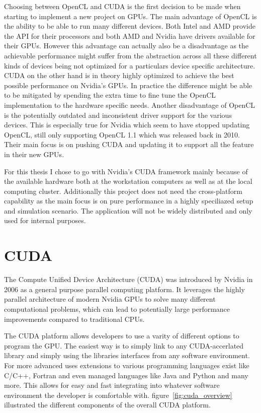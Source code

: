 \documentclass[a4paper,11pt]{kth-mag}
\begin{document}
Choosing between OpenCL and CUDA is the first decision to be made when starting to implement a new project on GPUs. The main advantage of OpenCL is the ability to be able to run many different devices. Both Intel and AMD provide the API for their processors and both AMD and Nvidia have drivers available for their GPUs. However this advantage can actually also be a disadvantage as the achievable performance might suffer from the abstraction across all these different kinds of devices being not optimized for a particulars device specific architecture. CUDA on the other hand is in theory highly optimized to achieve the best possible performance on Nvidia's GPUs. In practice the difference might be able to be mitigated by spending the extra time to fine tune the OpenCL implementation to the hardware specific needs. Another disadvantage of OpenCL is the potentially outdated and inconsistent driver support for the various devices. This is especially true for Nvidia which seem to have stopped updating OpenCL, still only supporting OpenCL 1.1 which was released back in 2010. Their main focus is on pushing CUDA and updating it to support all the feature in their new GPUs.

For this thesis I chose to go with Nvidia's CUDA framework mainly because of the available hardware both at the workstation computers as well as at the local computing cluster. Additionally this project does not need the cross-platform capability as the main focus is on pure performance in a highly speciliazed setup and simulation scenario. The application will not be widely distributed and only used for internal purposes.

\section{CUDA}
The Compute Unified Device Architecture (CUDA) was introduced by Nvidia in 2006 as a general purpose parallel computing platform. It leverages the highly parallel architecture of modern Nvidia GPUs to solve many different computational problems, which can lead to potentially large performance improvements compared to traditional CPUs.

The CUDA platform allows developers to use a varity of different options to program the GPU. The easiest way is to simply link to any CUDA-accerlated library and simply using the libraries interfaces from any software environment. For more advanced uses extensions to various programming languages exist like C/C++, Fortran and even managed languages like Java and Python and many more. This allows for easy and fast integrating into whatever software environment the developer is comfortable with. figure~\ref{fig:cuda_overview} illustrated the different components of the overall CUDA platform.
\end{document}
